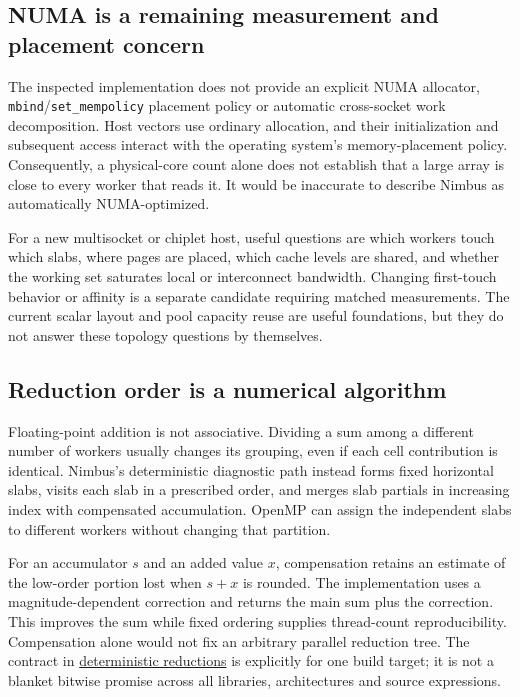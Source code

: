 \subsection{NUMA is a remaining measurement and placement concern}

The inspected implementation does not provide an explicit NUMA allocator,
\texttt{mbind}/\texttt{set\_mempolicy} placement policy or automatic
cross-socket work decomposition. Host vectors use ordinary allocation, and
their initialization and subsequent access interact with the operating
system's memory-placement policy. Consequently, a physical-core count alone
does not establish that a large array is close to every worker that reads it.
It would be inaccurate to describe Nimbus as automatically NUMA-optimized.

For a new multisocket or chiplet host, useful questions are which workers
touch which slabs, where pages are placed, which cache levels are shared, and
whether the working set saturates local or interconnect bandwidth. Changing
first-touch behavior or affinity is a separate candidate requiring matched
measurements. The current scalar layout and pool capacity reuse are useful
foundations, but they do not answer these topology questions by themselves.

\subsection{Reduction order is a numerical algorithm}

Floating-point addition is not associative. Dividing a sum among a different
number of workers usually changes its grouping, even if each cell contribution
is identical. Nimbus's deterministic diagnostic path instead forms fixed
horizontal slabs, visits each slab in a prescribed order, and merges slab
partials in increasing index with compensated accumulation. OpenMP can assign
the independent slabs to different workers without changing that partition.

For an accumulator $s$ and an added value $x$, compensation retains an estimate
of the low-order portion lost when $s+x$ is rounded. The implementation uses
a magnitude-dependent correction and returns the main sum plus the correction.
This improves the sum while fixed ordering supplies thread-count reproducibility.
Compensation alone would not fix an arbitrary parallel reduction tree.
The contract in
\href{../include/diagnostics/deterministic_reduction.hpp}{deterministic reductions}
is explicitly for one build target; it is not a blanket bitwise promise across
all libraries, architectures and source expressions.

